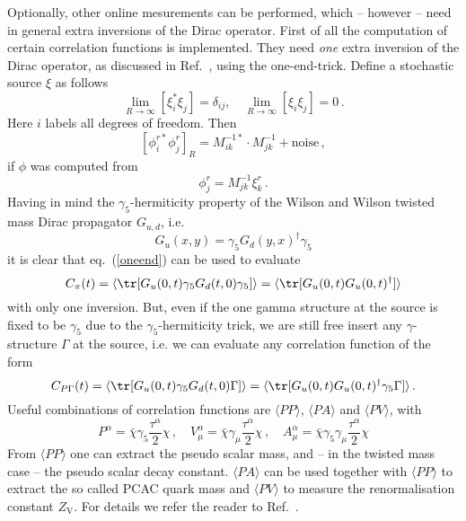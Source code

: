 Optionally, other online mesurements can be performed, which --
however -- need in general extra inversions of the Dirac
operator. First of all the computation of certain correlation
functions is implemented. They need \emph{one} extra inversion of the
Dirac operator, as discussed in Ref.~\cite{Boucaud:2008xu}, using the
one-end-trick. Define a stochastic source $\xi$ as follows
\begin{equation}
  \label{eq:source}
  \lim_{R\to\infty}[\xi_i^*\xi_j] = \delta_{ij},\quad
  \lim_{R\to\infty}[\xi_i\xi_j] = 0\, .
\end{equation}
Here $i$ labels all degrees of freedom. Then
\begin{equation}
  \label{oneend}
  [\phi_i^{r*}\phi_j^r]_R = M_{ik}^{-1*}\cdot M_{jk}^{-1} +
  \textrm{noise}\, ,
\end{equation}
if $\phi$ was computed from
\[
\phi_j^r  = M^{-1}_{jk}\xi_k^r\, .
\]
Having in mind the $\gamma_5$-hermiticity property of the Wilson and
Wilson twisted mass Dirac propagator $G_{u,d}$, i.e.
\[
G_u(x,y) = \gamma_5 G_d(y,x)^\dagger \gamma_5
\]
it is clear that eq.~(\ref{oneend}) can be used to evaluate
\[
C_\pi(t) = \langle \tr[G_u(0,t)\gamma_5 G_d(t,0)\gamma_5]\rangle =
\langle \tr[G_u(0,t) G_u(0,t)^\dagger]\rangle
\]
with only one inversion. But, even if the one gamma structure at the
source is fixed to be $\gamma_5$ due to the $\gamma_5$-hermiticity
trick, we are still free insert any $\gamma$-structure $\Gamma$ at the source,
i.e. we can evaluate any correlation function of the form
\[
C_{P\Gamma}(t) = \langle\tr[G_u(0,t) \gamma_5 G_d(t,0) \Gamma]\rangle
= \langle \tr[G_u(0,t) G_u(0,t)^\dagger\gamma_5\Gamma]\rangle\, .
\]
Useful combinations of correlation functions are $\langle P P\rangle$,
$\langle PA\rangle$ and $\langle PV\rangle$, with
\[
  P^\alpha = \bar\chi \gamma_5 \frac{\tau^\alpha}{2}\chi\, ,\quad
  V^\alpha_\mu = \bar\chi \gamma_\mu\frac{\tau^\alpha}{2}\chi\, ,\quad
  A^\alpha_\mu = \bar\chi \gamma_5\gamma_\mu\frac{\tau^\alpha}{2}\chi
\]
From $\langle P P\rangle$ one can extract the pseudo scalar mass, and
-- in the twisted mass case -- the pseudo scalar decay
constant. $\langle PA\rangle$ can be used together with $\langle P
P\rangle$ to extract the so called PCAC quark mass and $\langle
PV\rangle$ to measure the renormalisation constant $Z_\mathrm{V}$. For
details we refer the reader to Ref.~\cite{Boucaud:2008xu}.

